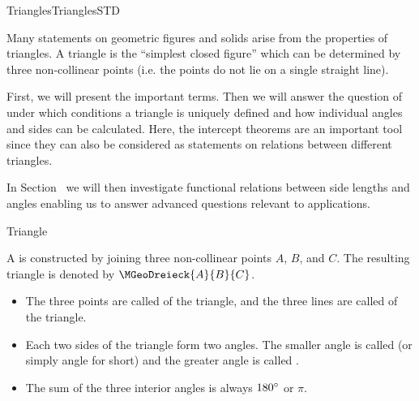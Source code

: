 \begin{MXContent}{Triangles}{Triangles}{STD}

Many statements on geometric figures and solids arise from the properties of 
triangles. A triangle is the ``simplest closed figure'' which can be determined by 
three non-collinear points (i.e. the points do not lie on a single straight line).



First, we will present the important terms. Then we will answer the question of
under which conditions a triangle is uniquely defined and how individual 
angles and sides can be calculated. Here, the intercept theorems are an important tool 
since they can also be considered as statements on relations between different triangles.

In Section~ we will then investigate functional relations 
between side lengths and angles enabling us to answer advanced questions 
relevant to applications.

\begin{MXInfo}{Triangle}%

A  is constructed by joining three non-collinear points $A$, $B$, and $C$. 
The resulting triangle is denoted by $\MGeoDreieck{A}{B}{C}$.

\begin{itemize}
 \item The three points are called  of the triangle, and the 
three lines are called  of the triangle.
    
 \item Each two sides of the triangle form two angles. The smaller angle is called 
 (or simply angle for short) and the greater 
angle is called .
 
 \item The sum of the three interior angles is always $180^{\circ}$ or $\pi$.
\end{itemize}
\end{MXInfo}


\end{MXContent}
